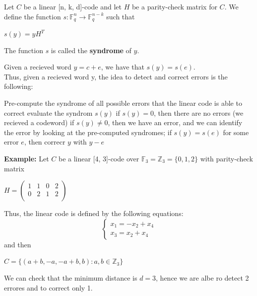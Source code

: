 \noindent
Let $C$ be a linear [n, k, d]-code and let $H$ be a parity-check matrix for $C$. We define the function $s : \mathbb{F}_q^n \rightarrow \mathbb{F}_q^{n-k}$ such that
\begin{center}
    $s(y) = yH^T$
\end{center}
\noindent
The function $s$ is called the \textbf{syndrome} of $y$.\\
\vspace{1 cm}

\noindent
Given a recieved word $y = c + e$, we have that $s(y) = s(e)$.\\
Thus, given a recieved word y, the idea to detect and correct errors is the following:

\begin{algorithm}
\begin{algorithmic}[1]

\State Pre-compute the syndrome of all possible errors that the linear code is able to correct
\State evaluate the syndrom $s(y)$
\State if $s(y) = 0$, then there are no errors (we recieved a codeword)
\State if $s(y) \neq 0$, then we have an error, and we can identify the error by looking at the pre-computed syndromes; if $s(y) = s(e)$ for some error $e$, then correcr $y$ with $y-e$ 

\end{algorithmic}
\end{algorithm}

\noindent
\textbf{Example:}
Let $C$ be a linear [4, 3]-code over $\mathbb{F}_3 = \mathbb{Z}_3 = \{0, 1, 2\}$ with parity-check matrix
\begin{center}
    $H = \begin{pmatrix}
        1 & 1 & 0 & 2 \\
        0 & 2 & 1 & 2 \\
    \end{pmatrix}$
\end{center}
\noindent
Thus, the linear code is defined by the following equations:
\[\begin{cases}
    x_1 = -x_2 + x_4 \\
    x_3 = x_2 + x_4
\end{cases}\]
\noindent
and then
\begin{center}
    $C = \{(a+b, -a, -a+b, b) : a, b \in \mathbb{Z}_3\}$
\end{center}
\noindent
We can check that the minimum distance is $d = 3$, hence we are albe ro detect 2 errores and to correct only 1.
\smallskip

